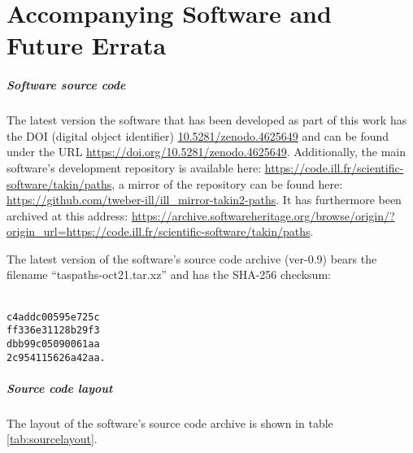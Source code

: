%
%

\chapter{Accompanying Software and Future Errata}
\label{ch:online}

\paragraph{Software source code}
The latest version the software that has been developed 
as part of this work has the DOI (digital object identifier)
\href{https://doi.org/10.5281/zenodo.4625649}{10.5281/zenodo.4625649}
and can be found under the URL \url{https://doi.org/10.5281/zenodo.4625649}.
Additionally, the main software's development repository is available here: 
\url{https://code.ill.fr/scientific-software/takin/paths},
a mirror of the repository can be found here: 
\url{https://github.com/tweber-ill/ill_mirror-takin2-paths}.
It has furthermore been archived at this address:
\url{https://archive.softwareheritage.org/browse/origin/?origin_url=https://code.ill.fr/scientific-software/takin/paths}.

The latest version of the software's source code archive (ver-0.9) bears the 
filename ``taspaths-oct21.tar.xz'' and has the SHA-256 \cite{web_sha256sum}
checksum:

\begin{centering}
\texttt{\\
c4addc00595e725c\phantom{.} \\
ff336e31128b29f3\phantom{.} \\
dbb99c05090061aa\phantom{.} \\
2c954115626a42aa.}\\
\end{centering}


\paragraph{Source code layout}
The layout of the software's source code archive is shown in table \ref{tab:sourcelayout}.

